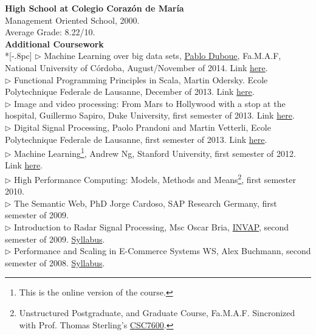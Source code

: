 \documentclass[letter,11pt,english]{article}
\begin{document}
{\bf High School at Colegio Coraz\'on de Mar\'ia}\\
Management Oriented School, 2000.\\
Average Grade: 8.22/10.\\


{\large \bf Additional Coursework}\\ *[-.8pc]
\underline{\hspace{6in}}
$\triangleright$ Machine Learning over big data sets,  \href{http://duboue.net/}{Pablo Duboue}, Fa.M.A.F, National University of C\'ordoba, August/November of 2014. Link \href{http://aprendizajengrande.net/}{here}. \\
$\triangleright$ Functional Programming Principles in Scala,  Martin Odersky. Ecole Polytechnique Federale de Lausanne, December of 2013. Link \href{https://www.coursera.org/course/progfun}{here}. \\
$\triangleright$ Image and video processing: From Mars to Hollywood with a stop at the hospital, Guillermo Sapiro, Duke University, first semester of 2013. Link \href{https://www.coursera.org/course/images}{here}. \\
$\triangleright$ Digital Signal Processing, Paolo Prandoni and Martin Vetterli, Ecole Polytechnique Federale de Lausanne, first semester of 2013. Link \href{https://www.coursera.org/course/dsp}{here}. \\
$\triangleright$ Machine Learning\footnote{This is the online version of the course.}, Andrew Ng, Stanford University, first semester of 2012. Link \href{http://www.ml-class.org}{here}. \\
$\triangleright$ High Performance Computing: Models, Methods and Means\footnote{Unstructured Postgraduate,
and Graduate Course, Fa.M.A.F. Sincronized with Prof. Thomas Sterling's 
\href{https://www.cct.lsu.edu/csc7600/Home.html}{CSC7600}.}, first semester 2010.\\
$\triangleright$ The Semantic Web, PhD Jorge Cardoso, SAP Research Germany, first semester of 2009.\\
$\triangleright$ Introduction to Radar Signal Processing, Msc Oscar Bria, 
\href{http://www.invap.net/index-e.php}{INVAP}, second semester of 2009. \href{http://postgrado.info.unlp.edu.ar/Cursos/Cursos/11-2011_Introduccion_al_Procesamiento_de_Senales_Radar.pdf}{Syllabus}.\\
$\triangleright$ Performance and Scaling in E-Commerce Systems WS, Alex Buchmann, second semester of 2008. 
\href{http://www.dvs.tu-darmstadt.de/teaching/perf/2008/}{Syllabus}.\\
\end{document}
